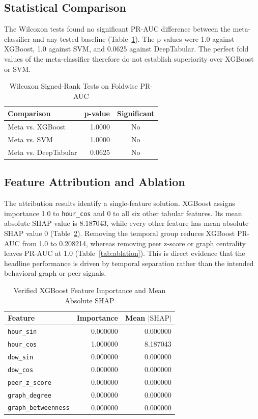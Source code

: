 \documentclass[journal]{IEEEtran}
\begin{document}
\subsection{Statistical Comparison}
The Wilcoxon tests found no significant PR-AUC difference between the meta-classifier and any tested baseline (Table~\ref{tab:significance}). The p-values were 1.0 against XGBoost, 1.0 against SVM, and 0.0625 against DeepTabular. The perfect fold values of the meta-classifier therefore do not establish superiority over XGBoost or SVM.

\begin{table}[!htbp]
\caption{Wilcoxon Signed-Rank Tests on Foldwise PR-AUC}
\label{tab:significance}
\centering
\begin{tabular}{lrc}
\toprule
Comparison & p-value & Significant \\
\midrule
Meta vs. XGBoost & 1.0000 & No \\
Meta vs. SVM & 1.0000 & No \\
Meta vs. DeepTabular & 0.0625 & No \\
\bottomrule
\end{tabular}
\end{table}

\subsection{Feature Attribution and Ablation}
The attribution results identify a single-feature solution. XGBoost assigns importance 1.0 to \texttt{hour\_cos} and 0 to all six other tabular features. Its mean absolute SHAP value is 8.187043, while every other feature has mean absolute SHAP value 0 (Table~\ref{tab:attribution}). Removing the temporal group reduces XGBoost PR-AUC from 1.0 to 0.208214, whereas removing peer z-score or graph centrality leaves PR-AUC at 1.0 (Table~\ref{tab:ablation}). This is direct evidence that the headline performance is driven by temporal separation rather than the intended behavioral graph or peer signals.

\begin{table}[!htbp]
\caption{Verified XGBoost Feature Importance and Mean Absolute SHAP}
\label{tab:attribution}
\centering
\begin{tabular}{lrr}
\toprule
Feature & Importance & Mean $|\mathrm{SHAP}|$ \\
\midrule
\texttt{hour\_sin} & 0.000000 & 0.000000 \\
\texttt{hour\_cos} & 1.000000 & 8.187043 \\
\texttt{dow\_sin} & 0.000000 & 0.000000 \\
\texttt{dow\_cos} & 0.000000 & 0.000000 \\
\texttt{peer\_z\_score} & 0.000000 & 0.000000 \\
\texttt{graph\_degree} & 0.000000 & 0.000000 \\
\texttt{graph\_betweenness} & 0.000000 & 0.000000 \\
\bottomrule
\end{tabular}
\end{table}
\end{document}

